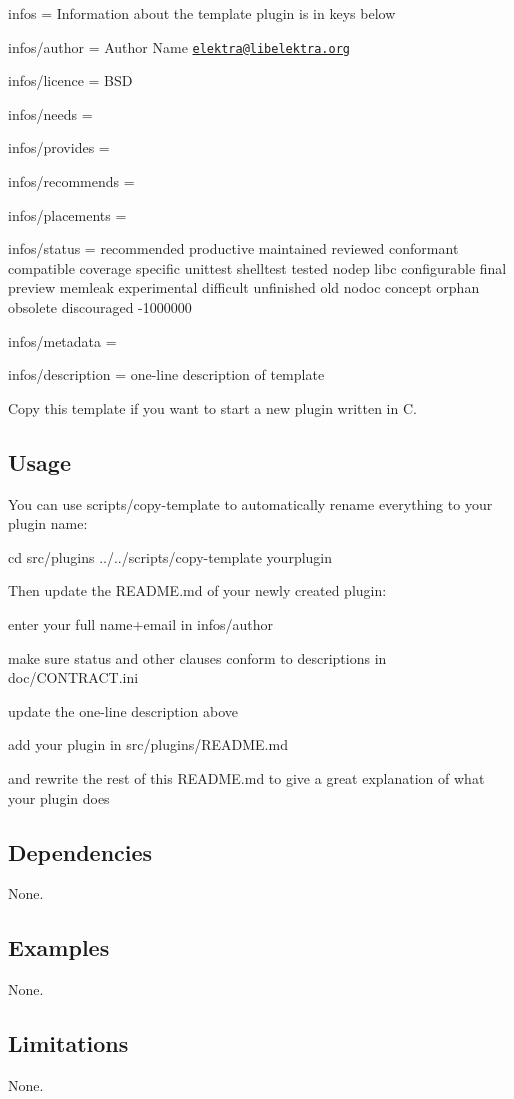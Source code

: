 
\begin{DoxyItemize}
\item infos = Information about the template plugin is in keys below
\item infos/author = Author Name \href{mailto:elektra@libelektra.org}{\tt elektra@libelektra.\+org}
\item infos/licence = B\+SD
\item infos/needs =
\item infos/provides =
\item infos/recommends =
\item infos/placements =
\item infos/status = recommended productive maintained reviewed conformant compatible coverage specific unittest shelltest tested nodep libc configurable final preview memleak experimental difficult unfinished old nodoc concept orphan obsolete discouraged -\/1000000
\item infos/metadata =
\item infos/description = one-\/line description of template
\end{DoxyItemize}

Copy this template if you want to start a new plugin written in C.

\subsection*{Usage}

You can use {\ttfamily scripts/copy-\/template} to automatically rename everything to your plugin name\+: \begin{DoxyVerb}    cd src/plugins
    ../../scripts/copy-template yourplugin
\end{DoxyVerb}


Then update the R\+E\+A\+D\+M\+E.\+md of your newly created plugin\+:


\begin{DoxyItemize}
\item enter your full name+email in {\ttfamily infos/author}
\item make sure {\ttfamily status} and other clauses conform to descriptions in {\ttfamily doc/\+C\+O\+N\+T\+R\+A\+C\+T.\+ini}
\item update the one-\/line description above
\item add your plugin in {\ttfamily src/plugins/\+R\+E\+A\+D\+M\+E.\+md}
\item and rewrite the rest of this {\ttfamily R\+E\+A\+D\+M\+E.\+md} to give a great explanation of what your plugin does
\end{DoxyItemize}

\subsection*{Dependencies}

None.

\subsection*{Examples}

None.

\subsection*{Limitations}

None. 